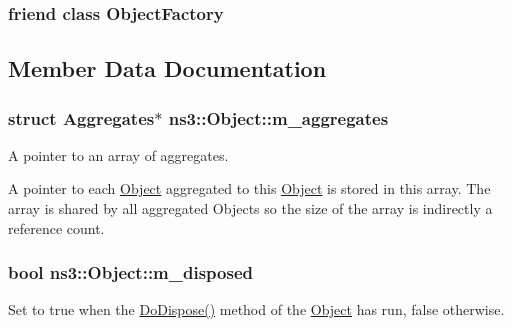 \subsubsection[{\texorpdfstring{Object\+Factory}{ObjectFactory}}]{\setlength{\rightskip}{0pt plus 5cm}friend class {\bf Object\+Factory}\hspace{0.3cm}{\ttfamily [friend]}}\hypertarget{classns3_1_1Object_a2810e70b8c8377aa8617138fc0f65e92}{}\label{classns3_1_1Object_a2810e70b8c8377aa8617138fc0f65e92}


\subsection{Member Data Documentation}
\subsubsection[{\texorpdfstring{m\+\_\+aggregates}{m_aggregates}}]{\setlength{\rightskip}{0pt plus 5cm}struct {\bf Aggregates}$\ast$ ns3\+::\+Object\+::m\+\_\+aggregates\hspace{0.3cm}{\ttfamily [private]}}\hypertarget{classns3_1_1Object_a1f0aff511aa8bbed3f3c3dc9b1d41fe4}{}\label{classns3_1_1Object_a1f0aff511aa8bbed3f3c3dc9b1d41fe4}
A pointer to an array of \textquotesingle{}aggregates\textquotesingle{}.

A pointer to each \hyperlink{classns3_1_1Object}{Object} aggregated to this \hyperlink{classns3_1_1Object}{Object} is stored in this array. The array is shared by all aggregated Objects so the size of the array is indirectly a reference count. 
\subsubsection[{\texorpdfstring{m\+\_\+disposed}{m_disposed}}]{\setlength{\rightskip}{0pt plus 5cm}bool ns3\+::\+Object\+::m\+\_\+disposed\hspace{0.3cm}{\ttfamily [private]}}\hypertarget{classns3_1_1Object_a37e25c1c8e56ae9e7f9c15f1236e4081}{}\label{classns3_1_1Object_a37e25c1c8e56ae9e7f9c15f1236e4081}
Set to {\ttfamily true} when the \hyperlink{classns3_1_1Object_a475d429a75d302d4775f4ae32479b287}{Do\+Dispose()} method of the \hyperlink{classns3_1_1Object}{Object} has run, {\ttfamily false} otherwise. 
